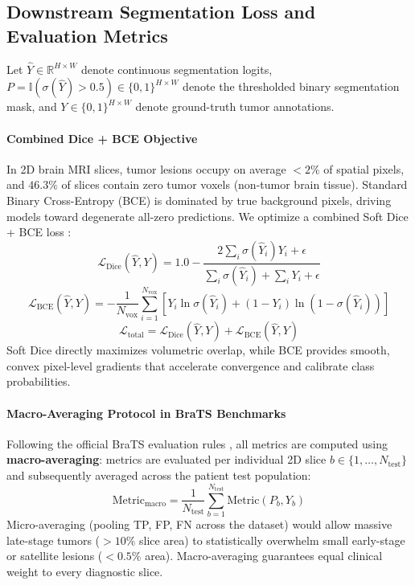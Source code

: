 \documentclass{article}
\begin{document}
\subsection{Downstream Segmentation Loss and Evaluation Metrics}

Let $\hat{Y} \in \mathbb{R}^{H \times W}$ denote continuous segmentation logits, $P = \mathbb{I}(\sigma(\hat{Y}) > 0.5) \in \{0, 1\}^{H \times W}$ denote the thresholded binary segmentation mask, and $Y \in \{0, 1\}^{H \times W}$ denote ground-truth tumor annotations.

\paragraph{Combined Dice + BCE Objective}
In 2D brain MRI slices, tumor lesions occupy on average $< 2\%$ of spatial pixels, and $46.3\%$ of slices contain zero tumor voxels (non-tumor brain tissue). Standard Binary Cross-Entropy (BCE) is dominated by true background pixels, driving models toward degenerate all-zero predictions. We optimize a combined Soft Dice + BCE loss \citep{milletari2016vnet,isensee2021nnunet}:
\begin{equation}
    \mathcal{L}_{\text{Dice}}(\hat{Y}, Y) = 1.0 - \frac{2 \sum_{i} \sigma(\hat{Y}_i) Y_i + \epsilon}{\sum_{i} \sigma(\hat{Y}_i) + \sum_{i} Y_i + \epsilon}
\end{equation}
\begin{equation}
    \mathcal{L}_{\text{BCE}}(\hat{Y}, Y) = - \frac{1}{N_{\text{vox}}} \sum_{i=1}^{N_{\text{vox}}} \left[ Y_i \ln \sigma(\hat{Y}_i) + (1 - Y_i) \ln(1 - \sigma(\hat{Y}_i)) \right]
\end{equation}
\begin{equation}
    \mathcal{L}_{\text{total}} = \mathcal{L}_{\text{Dice}}(\hat{Y}, Y) + \mathcal{L}_{\text{BCE}}(\hat{Y}, Y)
\end{equation}
Soft Dice directly maximizes volumetric overlap, while BCE provides smooth, convex pixel-level gradients that accelerate convergence and calibrate class probabilities.

\paragraph{Macro-Averaging Protocol in BraTS Benchmarks}
Following the official BraTS evaluation rules \citep{brats2024}, all metrics are computed using \textbf{macro-averaging}: metrics are evaluated per individual 2D slice $b \in \{1, \dots, N_{\text{test}}\}$ and subsequently averaged across the patient test population:
\begin{equation}
    \text{Metric}_{\text{macro}} = \frac{1}{N_{\text{test}}} \sum_{b=1}^{N_{\text{test}}} \text{Metric}(P_b, Y_b)
\end{equation}
Micro-averaging (pooling TP, FP, FN across the dataset) would allow massive late-stage tumors ($> 10\%$ slice area) to statistically overwhelm small early-stage or satellite lesions ($< 0.5\%$ area). Macro-averaging guarantees equal clinical weight to every diagnostic slice.
\end{document}
